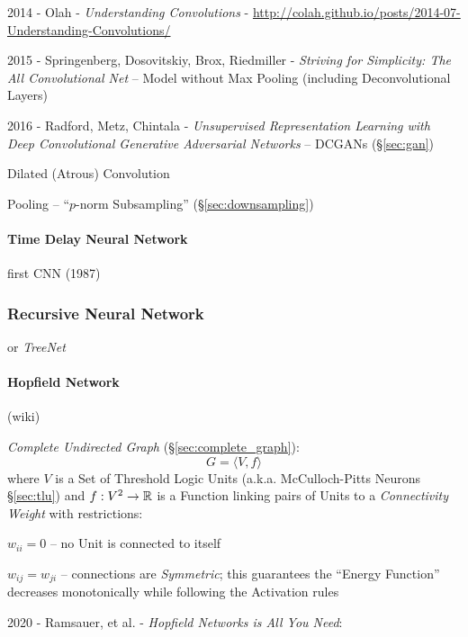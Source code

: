 2014 - Olah - \emph{Understanding Convolutions} -
  \url{http://colah.github.io/posts/2014-07-Understanding-Convolutions/}

2015 - Springenberg, Dosovitskiy, Brox, Riedmiller -
\emph{Striving for Simplicity: The All Convolutional Net}
-- Model without Max Pooling (including Deconvolutional Layers)

2016 - Radford, Metz, Chintala - \emph{Unsupervised Representation Learning with
  Deep Convolutional Generative Adversarial Networks} -- DCGANs
(\S\ref{sec:gan})

Dilated (Atrous) Convolution

Pooling -- ``$p$-norm Subsampling'' (\S\ref{sec:downsampling})



\paragraph{Time Delay Neural Network}\label{sec:tdnn}\hfill

first CNN (1987)



\subsubsection{Recursive Neural Network}\label{sec:recursive_nn}

or \emph{TreeNet}



\paragraph{Hopfield Network}\label{sec:hopfield_network}\hfill

(wiki)

\emph{Complete Undirected Graph} (\S\ref{sec:complete_graph}):
\[
  G = \langle{V, f}\rangle
\]
where $V$ is a Set of Threshold Logic Units (a.k.a. McCulloch-Pitts Neurons
\S\ref{sec:tlu}) and $f : V^2 \to \mathbb{R}$ is a Function linking pairs of
Units to a \emph{Connectivity Weight} with restrictions:

$w_{ii} = 0$ -- no Unit is connected to itself

$w_{ij} = w_{ji}$ -- connections are \emph{Symmetric}; this guarantees the
``Energy Function'' decreases monotonically while following the Activation rules

\asterism

2020 - Ramsauer, et al. - \emph{Hopfield Networks is All You Need}:

